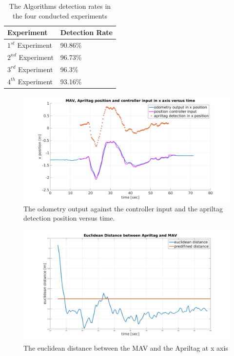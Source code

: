 \begin{table}
\begin{center}
    \begin{tabular}{ | l | l |}
    \hline
    Experiment & Detection Rate \\ \hline
    $1^{st}$ Experiment & 90.86\% \\ \hline
    $2^{nd}$ Experiment & 96.73\% \\ \hline
    $3^{rd}$ Experiment & 96.3\% \\ \hline
    $4^{th}$ Experiment & 93.16\% \\ \hline
    \end{tabular}
    \caption{The Algorithms detection rates in the four conducted experiments}
    \label{table:detctionRates}
\end{center}
\end{table}

\begin{figure}
	\centering
	 \includegraphics[width=1.00\textwidth]{images/real_MAV_odom_controller_bag3.pdf}
	 \caption{The odometry output against the controller input and the apriltag detection position versus time.}
	 \label{pics:realOdomControlDetection}
\end{figure}

\begin{figure}
	\centering
	 \includegraphics[width=1.00\textwidth]{images/real_euclidean_distance.pdf}
	 \caption{The euclidean distance between the MAV and the Apriltag at x axis}
	 \label{pics:euclideanDistance}
\end{figure}

